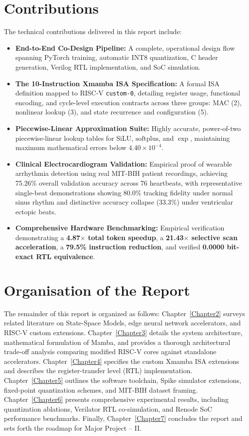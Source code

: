 \documentclass[11pt,a4paper,oneside]{report}
\begin{document}
\section{Contributions}
The technical contributions delivered in this report include:
\begin{itemize}
    \item \textbf{End-to-End Co-Design Pipeline:} A complete, operational design flow spanning PyTorch training, automatic INT8 quantization, C header generation, Verilog RTL implementation, and SoC simulation.
    \item \textbf{The 10-Instruction Xmamba ISA Specification:} A formal ISA definition mapped to RISC-V \texttt{custom-0}, detailing register usage, functional encoding, and cycle-level execution contracts across three groups: MAC (2), nonlinear lookup (3), and state recurrence and configuration (5).
    \item \textbf{Piecewise-Linear Approximation Suite:} Highly accurate, power-of-two piecewise-linear lookup tables for $\text{SiLU}$, $\text{softplus}$, and $\exp$, maintaining maximum mathematical errors below $4.40 \times 10^{-4}$.
    \item \textbf{Clinical Electrocardiogram Validation:} Empirical proof of wearable arrhythmia detection using real MIT-BIH patient recordings, achieving 75.26\% overall validation accuracy across 76 heartbeats, with representative single-beat demonstrations showing 80.0\% tracking fidelity under normal sinus rhythm and distinctive accuracy collapse (33.3\%) under ventricular ectopic beats.
    \item \textbf{Comprehensive Hardware Benchmarking:} Empirical verification demonstrating a \textbf{4.87$\times$ total token speedup}, a \textbf{21.43$\times$ selective scan acceleration}, a \textbf{79.5\% instruction reduction}, and verified \textbf{0.0000 bit-exact RTL equivalence}.
\end{itemize}

\section{Organisation of the Report}
The remainder of this report is organized as follows: Chapter~\ref{Chapter2} surveys related literature on State-Space Models, edge neural network accelerators, and RISC-V custom extensions. Chapter~\ref{Chapter3} details the system architecture, mathematical formulation of Mamba, and provides a thorough architectural trade-off analysis comparing modified RISC-V cores against standalone accelerators. Chapter~\ref{Chapter4} specifies the custom Xmamba ISA extensions and describes the register-transfer level (RTL) implementation. Chapter~\ref{Chapter5} outlines the software toolchain, Spike simulator extensions, fixed-point quantization schemes, and MIT-BIH dataset framing. Chapter~\ref{Chapter6} presents comprehensive experimental results, including quantization ablations, Verilator RTL co-simulation, and Renode SoC performance benchmarks. Finally, Chapter~\ref{Chapter7} concludes the report and sets forth the roadmap for Major Project -- II.
\end{document}
